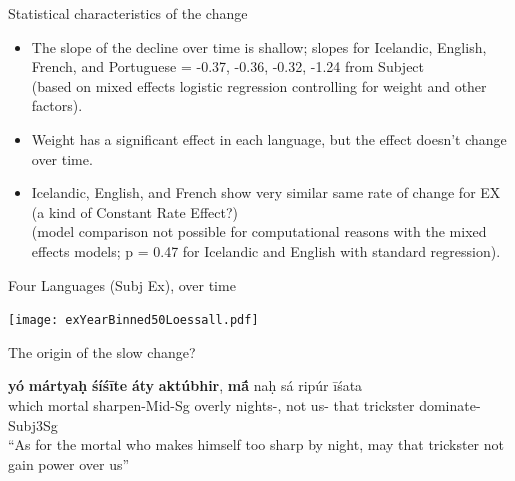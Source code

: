 \documentclass[hyperref={pdfpagelabels=false}]{beamer}
\begin{document}


\begin{frame}{Statistical characteristics of the change}
    \begin{itemize}
    	\item The slope of the decline over time is shallow; slopes for Icelandic, English, French, and Portuguese = -0.37, -0.36, -0.32, -1.24 from Subject\\(based on mixed effects logistic regression controlling for weight and other factors).
	\item Weight has a significant effect in each language, but the effect doesn't change over time.
	\item Icelandic, English, and French show very similar same rate of change for EX (a kind of Constant Rate Effect?)  \\\small{(model comparison not possible for computational reasons with the mixed effects models; p = 0.47 for Icelandic and English with standard regression)}.
\end{itemize}
\end{frame}



\begin{frame}{Four Languages (Subj Ex), over time}

\begin{center}
\texttt{[image: exYearBinned50Loessall.pdf]}
\end{center}
\end{frame}


\begin{frame}{The origin of the slow change?}
    \begin{exe}

\ex \label{vediccar1} \gll \textbf{yó} \textbf{mártya\d{h}} \textbf{śíś\={i}te} \textbf{áty} \textbf{aktúbhir}, \textbf{m\={\'{a}}} na\d{h} sá ripúr \={i}śata \\
which mortal sharpen-Mid-Sg overly nights-, not us- that trickster dominate-Subj3Sg\\
\quad ``As for the mortal who makes himself too sharp by night, may that trickster not gain power over us''\\
\citep[RV 1.36.16, cited in][156]{kiparsky1995}
\end{exe}
\end{frame}
\end{document}
